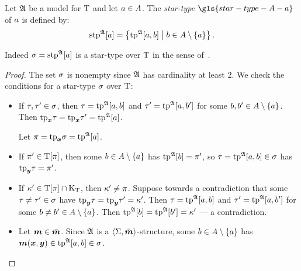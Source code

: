 \begin{definition}
Let $\mathfrak{A}$ be a model for $\mathrm{T}$
and let $a\in A$.
The \emph{star-type} $\gls{star-type-A-a}$ of $a$ is defined by:
\[
  \operatorname{stp}^{\mathfrak{A}}[a] = \left\{\operatorname{tp}^{\mathfrak{A}}[a,b]\mathrel{}\middle|\mathrel{}b \in A \setminus \left\{a\right\}\right\}.
\]
\end{definition}
\begin{remark}
Indeed $\sigma = \operatorname{stp}^{\mathfrak{A}}[a]$ is a star-type over $\mathrm{T}$ in the sense
of~.
\end{remark}
\begin{proof}
The set $\sigma$ is nonempty since $\mathfrak{A}$ has cardinality at least $2$.
We check the conditions for a star-type $\sigma$ over $\mathrm{T}$:
\begin{itemize}
  \item[\refcondstpx]
  If $\tau,{\tau'}\in\sigma$,
  then $\tau=\operatorname{tp}^{\mathfrak{A}}[a,b]$ and ${\tau'}=\operatorname{tp}^{\mathfrak{A}}[a,{b'}]$ for some
  $b,{b'}\in A\setminus\left\{a\right\}$.
  Then $\mathrm{tp}_{\bm{x}}\tau = \mathrm{tp}_{\bm{x}}{\tau'} = \operatorname{tp}^{\mathfrak{A}}[a]$.
  
  Let $\pi = \mathrm{tp}_{\bm{x}}\sigma = \operatorname{tp}^{\mathfrak{A}}[a]$.
  \item[\refcondstppy]
  If ${\pi'}\in\mathrm{T}[\pi]$,
  then some $b\in A\setminus\left\{a\right\}$ has $\operatorname{tp}^{\mathfrak{A}}[b] = {\pi'}$, so
  $\tau = \operatorname{tp}^{\mathfrak{A}}[a,b] \in \sigma$ has $\mathrm{tp}_{\bm{y}}\tau = {\pi'}$.
  \item[\refcondstpky]
  If ${\kappa'}\in\mathrm{T}[\pi]\cap{\mathrm{K}}_{\mathrm{T}}$, then ${\kappa'}\neq\pi$.
  Suppose towards a contradiction that some $\tau\neq{\tau'}\in\sigma$ have
  $\mathrm{tp}_{\bm{y}}\tau=\mathrm{tp}_{\bm{y}}{\tau'}={\kappa'}$.
  Then $\tau=\operatorname{tp}^{\mathfrak{A}}[a,b]$ and ${\tau'}=\operatorname{tp}^{\mathfrak{A}}[a,{b'}]$ for some
  $b\neq{b'}\in A\setminus\left\{a\right\}$.
  Then $\operatorname{tp}^{\mathfrak{A}}[b]=\operatorname{tp}^{\mathfrak{A}}[{b'}]={\kappa'}$ --- a contradiction.
  \item[\refcondstpm]
  Let $\bm{m}\in\bar{\bm{m}}$.
  Since $\mathfrak{A}$ is a $\left\langle \mathrm{\Sigma},\bar{\bm{m}} \right\rangle$-structure, some $b\in A\setminus\left\{a\right\}$
  has $\bm{m}(\bm{x},\bm{y}) \in \operatorname{tp}^{\mathfrak{A}}[a,b] \in \sigma$.
\end{itemize}
\end{proof}

